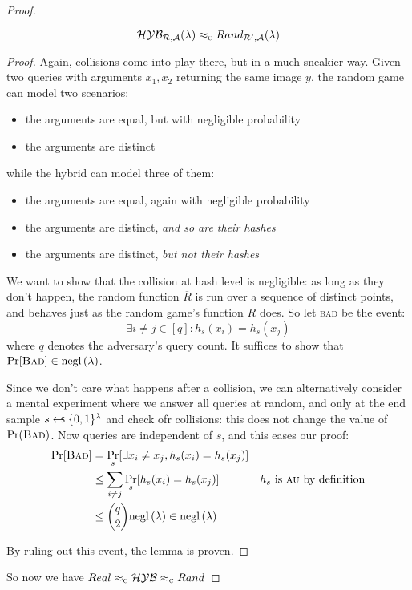 \begin{proof}
    \begin{lemma}
        \[
            \mathcal{H}\mathcal{Y}\mathcal{B}_{\mathcal{R}, \mathcal{A}}(\lambda) \approx_\textsc{c} Rand_{\mathcal{R}', \mathcal{A}}(\lambda)
        \]
    \end{lemma}

    \begin{proof}

        Again, collisions come into play there, but in a much sneakier way. Given two queries with arguments $x_1, x_2$ returning the same image $y$, the random game can model two scenarios:

        \begin{itemize}
            \item the arguments are equal, but with negligible probability
            \item the arguments are distinct
        \end{itemize}

        while the hybrid can model three of them:

        \begin{itemize}
            \item the arguments are equal, again with negligible probability
            \item the arguments are distinct, \emph{and so are their hashes}
            \item the arguments are distinct, \emph{but not their hashes}
        \end{itemize}
    
        We want to show that the collision at hash level is negligible: as long as they don't happen, the random function $\overline{R}$ is run over a sequence of distinct points, and behaves just as the random game's function $R$ does. So let \textsc{bad} be the event:
        \[
            \exists i \neq j \in [q] : h_s(x_i) = h_s(x_j)
        \]
        where $q$ denotes the adversary's query count. It suffices to show that $\Pr[\textsc{Bad}] \in \mathrm{negl}\left({\lambda}\right)$.

        Since we don't care what happens after a collision, we can alternatively consider a mental experiment where we answer all queries at random, and only at the end sample $s \pickUAR \{0, 1\}^\lambda$ and check ofr collisions: this does not change the value of $\Pr(\textsc{Bad})$. Now queries are independent of $s$, and this eases our proof:
        \begin{align*}
            \Pr[\textsc{Bad}] &= \Pr_s [\exists x_i \neq x_j, h_s(x_i) = h_s(x_j)] &\\
            &\leq \sum_{i \neq j} \Pr_s [h_s(x_i) = h_s(x_j)] & h_s \text{ is \textsc{au} by definition} \\
            &\leq {q \choose 2} \mathrm{negl}\left({\lambda}\right) \in \mathrm{negl}\left({\lambda}\right) &
        \end{align*}

        By ruling out this event, the lemma is proven.
    \end{proof}

     So now we have $Real \approx_\textsc{c} \mathcal{H}\mathcal{Y}\mathcal{B} \approx_\textsc{c} Rand$
\end{proof}

